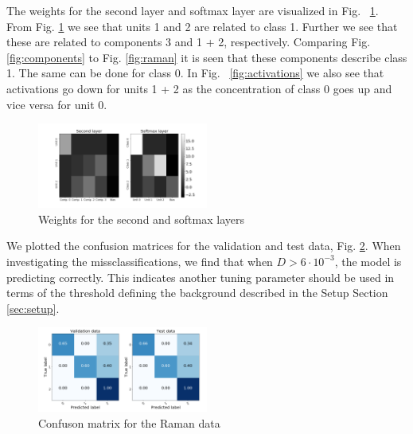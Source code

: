 \documentclass{article}
\begin{document}
The weights for the second layer and softmax layer are visualized in Fig. ~\ref{fig:weights}. From Fig. \ref{fig:weights} we see that units 1 and 2 are related to class 1. Further we see that these are related to components 3 and 1 + 2, respectively. Comparing Fig. \ref{fig:components} to Fig. \ref{fig:raman} it is seen that these components describe class 1. The same can be done for class 0. In Fig. ~\ref{fig:activations} we also see that activations go down for units 1 + 2 as the concentration of class 0 goes up and vice versa for unit 0.\\ 
%
\begin{figure}[H]
	\includegraphics[width=0.5\textwidth]{raman_sim_second_softmax_encode_2.png}
	\caption{Weights for the second and softmax layers}
	\label{fig:weights}
\end{figure}
%

We plotted the confusion matrices for the validation and test data, Fig. \ref{fig:confusion}. When investigating the missclassifications, we find that when $D > 6\cdot 10^{-3}$, the model is predicting correctly. This indicates another tuning parameter should be used in terms of the threshold defining the background described in the Setup Section \ref{sec:setup}.



\begin{figure}[H]
	\centering
	\includegraphics[width=0.5\textwidth]{raman_sim_3_conf_matrix13_2.png}
	\caption{Confuson matrix for the Raman data}
	\label{fig:confusion}
\end{figure}
\end{document}
